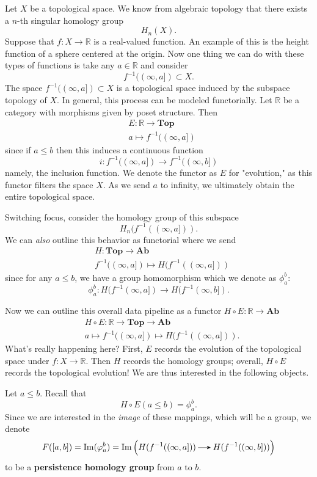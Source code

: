 Let $X$ be a topological space. We know from algebraic topology that 
there exists a $n$-th singular homology group 
\[
    H_n(X).
\]
Suppose that 
$f: X \to \mathbb{R}$ is a real-valued function. An example of this is the 
height function of a sphere centered at the origin. 
Now one thing we can do with these types of functions
is take any $a \in \mathbb{R}$ and consider
\[
    f^{-1}((\infty,a]) \subset X.
\]
The space $f^{-1}((\infty,a]) \subset X$ is a topological space induced by the 
subspace topology of $X$. In general, this process can be modeled functorially. 
Let $\mathbb{R}$ be a category with morphisms given by poset structure. Then
\begin{align*}
    &E: \mathbb{R} \to \textbf{Top}\\
    &a \longmapsto f^{-1}((\infty, a])
\end{align*}
since if $a \le b$ then this induces a continuous function 
\[
    i: f^{-1}((\infty, a]) \to f^{-1}((\infty, b])
\]
namely, the inclusion function.
\textcolor{NavyBlue}{We denote the functor as $E$ for "evolution," as this functor 
filters the space $X$. As we send $a$ to infinity, we ultimately obtain the entire 
topological space.}

Switching focus, consider the homology group of this subspace
\[
    H_n(f^{-1}((\infty, a])).
\]
We can \emph{also} outline this behavior as functorial where we send 
\begin{align*}
    &H:  \textbf{Top} \to \textbf{Ab} \\
    &f^{-1}((\infty, a]) \longmapsto H(f^{-1}((\infty, a]))
\end{align*}
since for any $a \le b$,
we have a group homomorphism which we denote as $\phi_a^b$:
\[
    \phi_a^b: H(f^{-1}(\infty, a]) \to H(f^{-1}(\infty, b]).
\]

Now we can outline this overall data pipeline as a functor $H \circ E: \mathbb{R} \to \textbf{Ab}$
\begin{align*}
    &H \circ E: \mathbb{R} \to \textbf{Top} \to \textbf{Ab} \\
    & a \longmapsto f^{-1}((\infty, a]) \longmapsto H(f^{-1}((\infty, a])).
\end{align*}
What's really happening here? First, $E$ records the evolution of the topological 
space under $f: X \to \mathbb{R}$. Then $H$ records the homology groups; overall, $H \circ E$ 
records the topological evolution! We are thus interested in the following objects.

\begin{definition}
    Let $a \le b$. Recall that 
    \[
        H\circ E(a \le b) = \phi_a^b.   
    \] 
    Since we are interested in the \emph{image} of these mappings, 
    which will be a group, we denote
    \[
        F([a, b]) = \im(\phi_a^b) = \im\Big( H(f^{-1}((\infty, a ])) \to H(f^{-1}((\infty, b])) \Big)
    \]
    to be a \textbf{persistence homology group} from $a$ to $b$. 
\end{definition}

